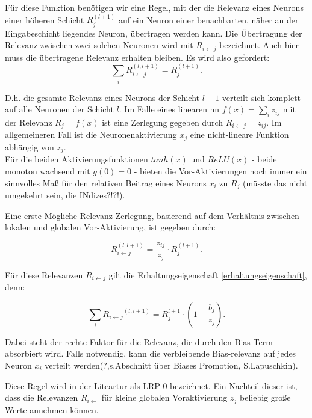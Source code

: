 \documentclass[11pt,a4paper]{article}
\numberwithin{equation}{section}
\begin{document}
	
	Für diese Funktion benötigen wir eine Regel, mit der die Relevanz eines Neurons einer höheren Schicht $R_j^{(l+1)}$ auf ein Neuron einer benachbarten, näher an der Eingabeschicht liegendes Neuron, übertragen werden kann.
	Die Übertragung der Relevanz zwischen zwei solchen Neuronen wird mit $R_{i\leftarrow j}$ bezeichnet. Auch hier muss die übertragene Relevanz erhalten bleiben. Es wird also gefordert:
	\begin{equation}
	\sum_i{R_{i\leftarrow j}^{(l,l+1)}} = R_j^{(l+1)}.
	\end{equation}
	
	D.h. die gesamte Relevanz eines Neurons der Schicht $l+1$ verteilt sich komplett auf alle Neuronen der Schicht $l$.
	Im Falle eines linearen \gls{nn} $f(x) = \sum_i{z_{ij}}$ mit der Relevanz $R_j = f(x)$ ist eine Zerlegung gegeben durch $R_{i\leftarrow j} = z_{ij}.$
	Im allgemeineren Fall ist die Neuronenaktivierung $x_j$ eine nicht-lineare Funktion abhängig von $z_j$.\\
	Für die beiden Aktivierungsfunktionen $tanh(x)$ und $ReLU(x)$ - beide monoton wachsend mit $g(0)=0$ - bieten die Vor-Aktivierungen noch immer ein sinnvolles Maß für den relativen Beitrag eines Neurons $x_i$ zu $R_j$ (müsste das nicht umgekehrt sein, die INdizes?!?!).
	
	Eine erste Mögliche Relevanz-Zerlegung, basierend auf dem Verhältnis zwischen lokalen und globalen Vor-Aktivierung, ist gegeben durch:
	
	\begin{equation}
	R_{i\leftarrow j}^{(l,l+1)} = \frac{z_{ij}}{z_j} \cdot R_j^{(l+1)}.
	\end{equation}
	
	Für diese Relevanzen $R_{i \leftarrow j}$ gilt die Erhaltungseigenschaft \ref{erhaltungseigenschaft}, denn:
	
	\begin{equation}
	\sum_i{R_{i \leftarrow j}}^{(l,l+1)} = R_{j}^{l+1} \cdot (1-\frac{b_j}{z_j}).
	\end{equation}
	
	Dabei steht der rechte Faktor für die Relevanz, die durch den Bias-Term absorbiert wird.
	Falls notwendig, kann die verbleibende Bias-relevanz auf jedes Neuron $x_i$ verteilt werden(?,s.Abschnitt über Biases Promotion, S.Lapuschkin).
	
	Diese Regel wird in der Liteartur als LRP-0 bezeichnet.
	Ein Nachteil dieser ist, dass die Relevanzen $R_{i \leftarrow}$ für kleine globalen Voraktivierung $z_j$ beliebig große Werte annehmen können.
	
\end{document}
